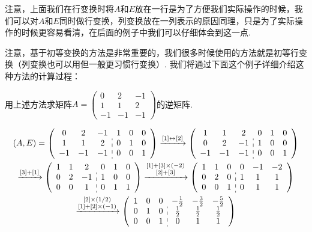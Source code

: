 注意，上面我们在行变换时将$A$和$E$放在一行是为了方便我们实际操作的时候，我们可以对$A$和$E$同时做行变换，列变换放在一列表示的原因同理，只是为了实际操作的时候更容易看清，在后面的例子中我们可以仔细体会到这一点.

注意，基于初等变换的方法是非常重要的，我们很多时候使用的方法就是初等行变换（列变换也可以用但一般更习惯行变换）. 我们将通过下面这个例子详细介绍这种方法的计算过程：
\begin{example}{}{}
    用上述方法求矩阵$A=\begin{pmatrix}0 & 2 & -1 \\ 1 & 1 & 2 \\ -1 & -1 & -1\end{pmatrix}$的逆矩阵.
\end{example}

\begin{solution}
    \begin{gather*}
        (A, E) =
        \left(\begin{array}{ccc:ccc}
                0  & 2  & -1 & 1 & 0 & 0 \\
                1  & 1  & 2  & 0 & 1 & 0 \\
                -1 & -1 & -1 & 0 & 0 & 1
            \end{array}\right)
        \xrightarrow{[1] \leftrightarrow [2]}
        \left(\begin{array}{ccc:ccc}
                1  & 1  & 2  & 0 & 1 & 0 \\
                0  & 2  & -1 & 1 & 0 & 0 \\
                -1 & -1 & -1 & 0 & 0 & 1
            \end{array}\right) \\
        \xrightarrow{[3] + [1]}
        \left(\begin{array}{ccc:ccc}
                1 & 1 & 2  & 0 & 1 & 0 \\
                0 & 2 & -1 & 1 & 0 & 0 \\
                0 & 0 & 1  & 0 & 1 & 1
            \end{array}\right)
        \xrightarrow{\substack{[1] + [3] \times (-2) \\ [2] + [3]}}
        \left(\begin{array}{ccc:ccc}
                1 & 1 & 0 & 0 & -1 & -2 \\
                0 & 2 & 0 & 1 & 1  & 1  \\
                0 & 0 & 1 & 0 & 1  & 1
            \end{array}\right) \\
        \xrightarrow{\substack{[2] \times (1/2) \\ [1] + [2] \times (-1)}}
        \left(
        \begin{array}{ccc:ccc}
                1 & 0 & 0 & -\frac{1}{2} & -\frac{3}{2} & -\frac{5}{2} \\
                0 & 1 & 0 & \frac{1}{2}  & \frac{1}{2}  & \frac{1}{2}  \\
                0 & 0 & 1 & 0            & 1            & 1
            \end{array}
        \right)
    \end{gather*}


\end{solution}

